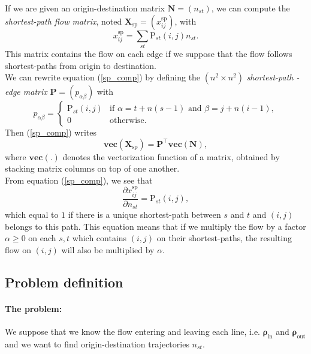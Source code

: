 \documentclass[11p]{article}
\begin{document}
If we are given an origin-destination matrix $\mathbf{N} = (n_{st})$, we can compute the \emph{shortest-path flow matrix}, noted $\mathbf{X}_\text{sp} = (x^\text{sp}_{ij})$, with
\begin{equation}
x^\text{sp}_{ij} = \sum_{st} \text{P}_{st}(i, j) n_{st} \label{sp_comp}.
\end{equation}
This matrix contains the flow on each edge if we suppose that the flow follows shortest-paths from origin to destination. \\

We can rewrite equation (\ref{sp_comp}) by defining the $(n^2 \times n^2)$ \emph{shortest-path - edge matrix} $\mathbf{P} = (p_{\alpha \beta})$ with
\begin{equation}
p_{\alpha \beta} = \begin{cases}
\text{P}_{st}(i, j) & \text{if } \alpha = t + n(s - 1) \text{ and }  \beta = j + n(i - 1), \\
0 & \text{otherwise}.
\end{cases}
\end{equation}
Then (\ref{sp_comp}) writes
\begin{equation}
\textbf{vec}(\mathbf{X}_\text{sp}) = \mathbf{P}^\top \textbf{vec}(\mathbf{N}),
\end{equation}
where $\textbf{vec}(.)$ denotes the vectorization function of a matrix, obtained by stacking matrix columns on top of one another. \\

From equation (\ref{sp_comp}), we see that 
\begin{equation}
\frac{\partial x^\text{sp}_{ij}}{\partial n_{st}} = \text{P}_{st}(i, j),
\end{equation}
which equal to $1$ if there is a unique shortest-path between $s$ and $t$ and $(i,j)$ belongs to this path. This equation means that if we multiply the flow by a factor $\alpha \geq 0$ on each $s, t$ which contains $(i, j)$ on their shortest-paths, the resulting flow on $(i, j)$ will also be multiplied by $\alpha$.

\subsection{Problem definition}

\paragraph{The problem:} We suppose that we know the flow entering and leaving each line, i.e. $\bm{\rho}_\text{in}$ and $\bm{\rho}_\text{out}$ and we want to find origin-destination trajectories $n_{st}$. \\
\end{document}
